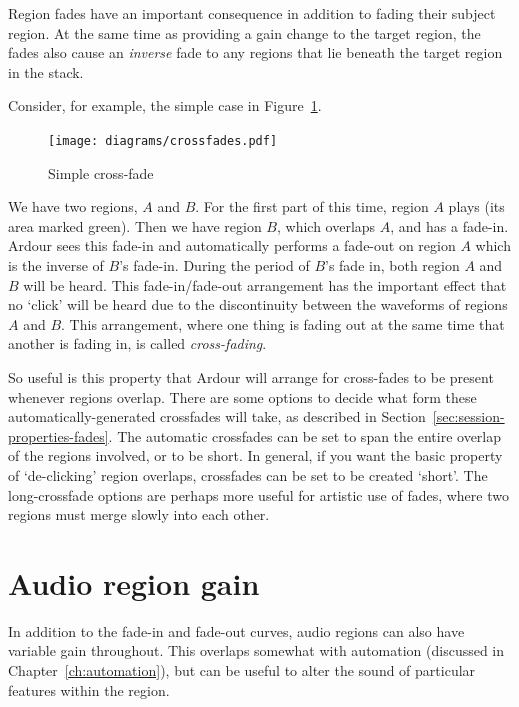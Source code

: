 \documentclass[10pt,a4paper]{book}
\begin{document}
{Region fades have an important consequence in addition to fading their
subject region.  At the same time as providing a gain change to the
target region, the fades also cause an \emph{inverse} fade to any
regions that lie beneath the target region in the stack.

Consider, for example, the simple case in Figure~\ref{fig:crossfades}.

\begin{figure}[ht]
\begin{center}
\texttt{[image: diagrams/crossfades.pdf]}
\end{center}
\caption{Simple cross-fade}
\label{fig:crossfades}
\end{figure}

We have two regions, $A$ and $B$.  For the first part of this time,
region $A$ plays (its area marked green).  Then we have region $B$,
which overlaps $A$, and has a fade-in.  Ardour sees this fade-in and
automatically performs a fade-out on region $A$ which is the inverse
of $B$'s fade-in.  During the period of $B$'s fade in, both region $A$
and $B$ will be heard.  This fade-in/fade-out arrangement has the
important effect that no `click' will be heard due to the
discontinuity between the waveforms of regions $A$ and $B$.  This
arrangement, where one thing is fading out at the same time that
another is fading in, is called \emph{cross-fading}.

So useful is this property that Ardour will arrange for cross-fades to
be present whenever regions overlap.  There are some options to decide
what form these automatically-generated crossfades will take, as
described in Section~\ref{sec:session-properties-fades}.  The
automatic crossfades can be set to span the entire overlap of the
regions involved, or to be short.  In general, if you want the basic
property of `de-clicking' region overlaps, crossfades can be set to be
created `short'.  The long-crossfade options are perhaps more useful for
artistic use of fades, where two regions must merge slowly into each
other.



\section{Audio region gain}
\label{sec:audio-region-gain}

In addition to the fade-in and fade-out curves, audio regions can also
have variable gain throughout.  This overlaps somewhat with automation
(discussed in Chapter~\ref{ch:automation}), but can be useful to alter
the sound of particular features within the region.

}
\end{document}
